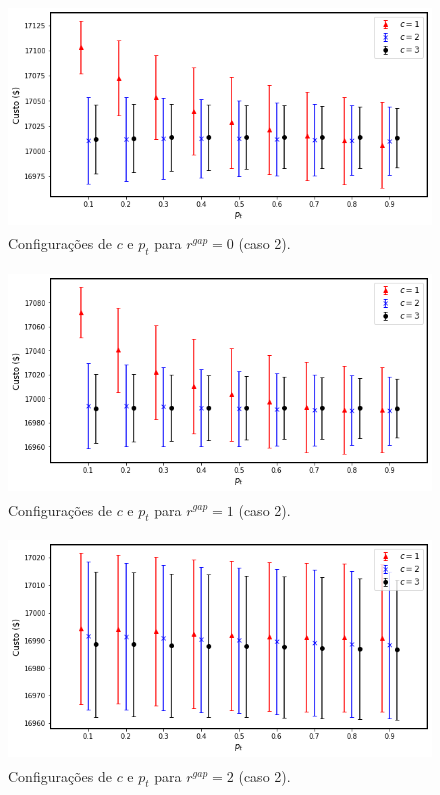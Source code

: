 \documentclass[
	12pt,				%
	openany,			%
	twoside,			%
	a4paper,			%
	chapter=TITLE,		%
	section=Title,		%
	subsection=Title,	%
	subsubsection=Title,%
	english,			%
	french,				%
	spanish,			%
	brazil			%
	]{abntex2}
\begin{document}
\begin{ERRATA}
\begin{apendicesenv}
\begin{figure}[h!]
    \caption{\label{rgap0_19}Configurações de $c$ e $p_t$ para $r^{gap}=0$ (caso 2).}
    \centering
    \includegraphics[width=120mm, height=60mm]{images/rgap0_19.png}
   
\end{figure}

\begin{figure} [h!]
    \centering
    \caption{\label{rgap1_19}Configurações de $c$ e $p_t$ para $r^{gap}=1$ (caso 2).}
    \includegraphics[width=120mm, height=60mm]{images/rgap1_19.png}
\end{figure}


\begin{figure}[h!]
    \caption{\label{rgap2_19}Configurações de $c$ e $p_t$ para $r^{gap}=2$ (caso 2).}
    \centering
    \includegraphics[width=120mm, height=60mm]{images/rgap2_19.png}


\end{figure}
\end{apendicesenv}
\end{ERRATA}
\end{document}

